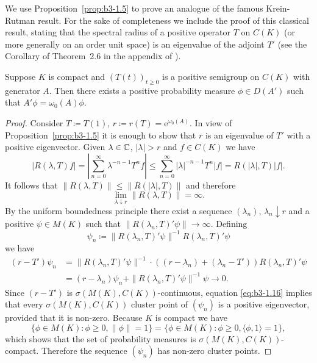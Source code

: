 We use Proposition~\ref{prop:b3-1.5} to prove an analogue of the famous Krein-Rutman result.
For the sake of completeness we include the proof of this classical result, stating that the spectral radius of a positive operator $T$ on $C(K)$ (or more generally on an order unit space) is an eigenvalue of the adjoint $T'$ (see the Corollary of Theorem~2.6 in the appendix of \citet{schaefer:1966}).
\begin{theorem}\label{thm:b3-1.6}
	Suppose $K$ is compact and $(T(t))_{t \geq 0}$ is a positive semigroup on $C(K)$ with generator $A$.
	Then there exists a positive probability measure $\phi \in D(A')$ such that $A'\phi = \omega_{0}(A)\phi$.
\end{theorem}
\begin{proof}
	Consider $T \coloneqq T(1)$, $r \coloneqq r(T) = \mathrm{e}^{\omega_{0}(A)}$.
	In view of Proposition~\ref{prop:b3-1.5} it is enough to show that $r$ is an eigenvalue of $T'$ with a positive eigenvector.
	Given $\lambda \in \mathbb{C}$, $|\lambda| > r$ and $f \in C(K)$ we have
	\[
	|R(\lambda,T)f| = \left|\sum_{n=0}^{\infty} \lambda^{-n-1} T^{n}f\right| \leq \sum_{n=0}^{\infty} |\lambda|^{-n-1} T^{n}|f| = R(|\lambda|,T) |f|.
	\]
	It follows that $\|R(\lambda,T)\| \leq \|R(|\lambda|,T)\|$ and therefore
	\begin{equation}\label{eq:b3-1.15}
		\lim_{\lambda \downarrow r}\|R(\lambda,T)\| = \infty.
	\end{equation}
	By the uniform boundedness principle there exist a sequence $(\lambda_{n})$, $\lambda_{n} \downarrow r$ and a positive $\psi \in M(K)$ such that $\|R(\lambda_{n},T)'\psi\| \to \infty$.
	Defining 
    \[
    \psi_{n} \coloneqq \|R(\lambda_{n},T)'\psi\|^{-1}R(\lambda_{n},T)'\psi
    \] we have
	\begin{equation}\label{eq:b3-1.16}
		\begin{split}
		(r - T')\psi_{n} & = \|R(\lambda_{n},T)'\psi\|^{-1}\cdot((r-\lambda_{n}) + (\lambda_{n} - T'))R(\lambda_{n},T)'\psi\\ 
		& = (r-\lambda_{n})\psi_{n} + \|R(\lambda_{n},T)'\psi\|^{-1}\psi \to 0.
		\end{split}
	\end{equation}
	Since $(r - T')$ is $\sigma(M(K),C(K))$-continuous, equation \eqref{eq:b3-1.16} implies that every $\sigma(M(K),C(K))$ cluster point of $(\psi_{n})$ is a positive eigenvector, provided that it is non-zero.
	Because $K$ is compact we have 
%
\[
	\{\phi \in M(K) \colon \phi \geq 0, \|\phi\| = 1\} 
	= \{\phi \in M(K) \colon \phi \geq 0, \langle \phi,1 \rangle = 1\} , 
\]
which shows that the set of probability measures is $\sigma(M(K),C(K))$-compact.
	Therefore the sequence $(\psi_{n})$ has non-zero cluster points.
\end{proof}
